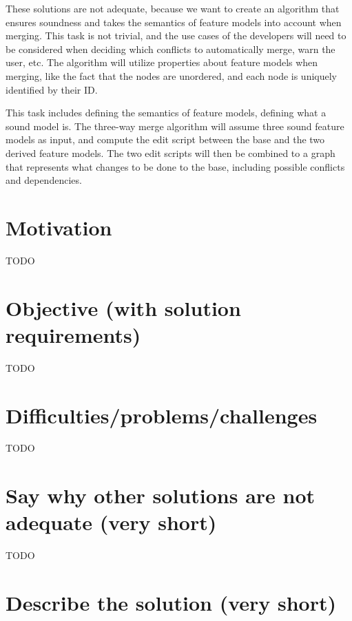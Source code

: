 \documentclass[a4paper,english]{ifimaster}
\begin{document}
These solutions are not adequate, because we want to create an algorithm that ensures soundness and takes the semantics of feature models into account when merging. This task is not trivial, and the use cases of the developers will need to be considered when deciding which conflicts to automatically merge, warn the user, etc. The algorithm will utilize properties about feature models when merging, like the fact that the nodes are unordered, and each node is uniquely identified by their ID.

This task includes defining the semantics of feature models, defining what a sound model is. The three-way merge algorithm will assume three sound feature models as input, and compute the edit script between the base and the two derived feature models. The two edit scripts will then be combined to a graph that represents what changes to be done to the base, including possible conflicts and dependencies.

\section{Motivation}
\label{sec:motivation}

TODO

\section{Objective (with solution requirements)}
\label{sec:objective_with_solution_requirements_}

TODO

\section{Difficulties/problems/challenges}
\label{sec:difficulties_problems_challenges}

TODO

\section{Say why other solutions are not adequate (very short)}
\label{sec:say_why_other_solutions_are_not_adequate_very_short_}

TODO

\section{Describe the solution (very short)}
\label{sec:describe_the_solution_very_short_}
\end{document}
